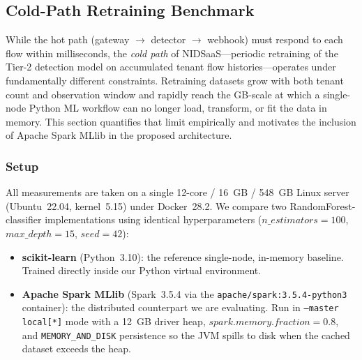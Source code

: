 %

\subsection{Cold-Path Retraining Benchmark}
\label{sec:retraining}

While the hot path (gateway $\rightarrow$ detector $\rightarrow$ webhook)
must respond to each flow within milliseconds, the \emph{cold path}
of NIDSaaS---periodic retraining of the Tier-2 detection model on
accumulated tenant flow histories---operates under fundamentally
different constraints. Retraining datasets grow with both tenant count
and observation window and rapidly reach the GB-scale at which a
single-node Python ML workflow can no longer load, transform, or fit
the data in memory. This section quantifies that limit empirically
and motivates the inclusion of Apache Spark MLlib in the proposed
architecture.

\subsubsection{Setup}
\label{sec:retraining-setup}

All measurements are taken on a single 12-core / 16~GB / 548~GB Linux
server (Ubuntu~22.04, kernel~5.15) under Docker~28.2. We compare two
RandomForest-classifier implementations using identical hyperparameters
($n\_estimators=100$, $max\_depth=15$, $seed=42$):

\begin{itemize}
\item \textbf{scikit-learn} (Python~3.10): the reference single-node,
      in-memory baseline. Trained directly inside our Python virtual
      environment.
\item \textbf{Apache Spark MLlib} (Spark~3.5.4 via the
      \texttt{apache/spark:3.5.4-python3} container): the distributed
      counterpart we are evaluating. Run in
      \texttt{--master local[*]} mode with a 12~GB driver heap,
      $\textit{spark.memory.fraction}=0.8$, and
      \texttt{MEMORY\_AND\_DISK} persistence so the JVM spills to disk
      when the cached dataset exceeds the heap.
\end{itemize}

